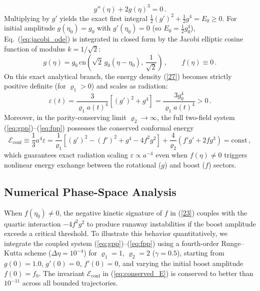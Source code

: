 \documentclass[11pt, a4paper]{article}
\newcommand{\subst}[1]{\textcolor{substantive}{#1}}
\begin{document}
\begin{equation}\label{eq:jacobi_ode}
g''(\eta) + 2g(\eta)^3 = 0\,.
\end{equation}
\subst{Multiplying by $g'$ yields the exact first integral $\frac{1}{2}(g')^2 + \frac{1}{2}g^4 = E_0 \ge 0$. For initial amplitude $g(\eta_0) = g_0$ with $g'(\eta_0) = 0$ (so $E_0 = \frac{1}{2}g_0^4$), Eq.\ (\ref{eq:jacobi_ode}) is integrated in closed form by the Jacobi elliptic cosine function of modulus $k = 1/\sqrt{2}$:}
\begin{equation}\label{eq:jacobi_sol}
g(\eta) = g_0 \, \mathrm{cn}\!\left(\sqrt{2}\, g_0 (\eta - \eta_0),\, \frac{1}{\sqrt{2}}\right)\,, \qquad f(\eta) \equiv 0\,.
\end{equation}
\subst{On this exact analytical branch, the energy density (\ref{27}) becomes strictly positive definite (for $\varrho_1 > 0$) and scales as radiation:}
\begin{equation}\label{eq:exact_eps}
\varepsilon(t) = \frac{3}{\varrho_1 a(t)^4}\left[(g')^2 + g^4\right] = \frac{3 g_0^4}{\varrho_1 a(t)^4} > 0\,.
\end{equation}
\subst{Moreover, in the parity-conserving limit $\varrho_2 \to \infty$, the full two-field system (\ref{eq:gpp})--(\ref{eq:fpp}) possesses the conserved conformal energy}
\begin{equation}\label{eq:conserved_E}
\mathcal{E}_{\mathrm{conf}} \equiv \frac{1}{3} a^4 \varepsilon = \frac{1}{\varrho_1}\left[(g')^2 - (f')^2 + g^4 - 4f^2 g^2\right] + \frac{4}{\varrho_2}\left(f' g' + 2f g^3\right) = \mathrm{const}\,,
\end{equation}
\subst{which guarantees exact radiation scaling $\varepsilon \propto a^{-4}$ even when $f(\eta) \neq 0$ triggers nonlinear energy exchange between the rotational ($g$) and boost ($f$) sectors.}

\subst{\subsection{Numerical Phase-Space Analysis}}

\subst{When $f(\eta_0) \neq 0$, the negative kinetic signature of $f$ in (\ref{23}) couples with the quartic interaction $-4f^2 g^2$ to produce runaway instabilities if the boost amplitude exceeds a critical threshold. To illustrate this behavior quantitatively, we integrate the coupled system (\ref{eq:gpp})--(\ref{eq:fpp}) using a fourth-order Runge--Kutta scheme ($\Delta\eta = 10^{-4}$) for $\varrho_1 = 1$, $\varrho_2 = 2$ ($\gamma = 0.5$), starting from $g(0) = 1.0$, $g'(0) = 0$, $f'(0) = 0$, and varying the initial boost amplitude $f(0) = f_0$. The invariant $\mathcal{E}_{\mathrm{conf}}$ in (\ref{eq:conserved_E}) is conserved to better than $10^{-11}$ across all bounded trajectories.}
\end{document}
